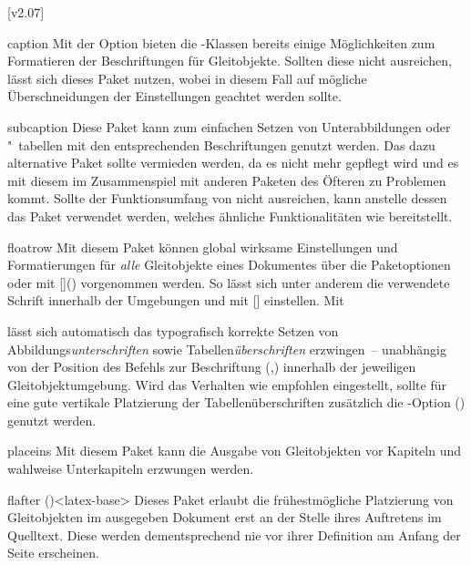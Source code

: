 [v2.07]
%
%
\begin{packages}
\item[caption]
  Mit der Option  bieten die 
  \KOMAScript-Klassen bereits einige Möglichkeiten zum Formatieren der 
  Beschriftungen für Gleitobjekte. Sollten diese nicht ausreichen, lässt sich 
  dieses Paket nutzen, wobei in diesem Fall auf mögliche Überschneidungen der 
  Einstellungen geachtet werden sollte.
\item[subcaption]
  Diese Paket kann zum einfachen Setzen von Unterabbildungen oder "~tabellen 
  mit den entsprechenden Beschriftungen genutzt werden. Das dazu alternative 
  Paket  sollte vermieden werden, da es nicht mehr gepflegt 
  wird und es mit diesem im Zusammenspiel mit anderen Paketen des Öfteren zu 
  Problemen kommt. Sollte der Funktionsumfang von  nicht 
  ausreichen, kann anstelle dessen das Paket  verwendet 
  werden, welches ähnliche Funktionalitäten wie  bereitstellt.
\item[floatrow]
  Mit diesem Paket können global wirksame Einstellungen und Formatierungen für 
  \emph{alle} Gleitobjekte eines Dokumentes über die Paketoptionen oder mit 
  [\MPValue{\dots}]() vorgenommen werden. 
  So lässt sich unter anderem die verwendete Schrift innerhalb der Umgebungen 
   und  mit 
  [] einstellen. Mit 
  \begin{Code}
  \end{Code}\vspace{-\baselineskip}%
  lässt sich automatisch das typografisch korrekte Setzen von 
  Abbildungs\emph{unterschriften} sowie Tabellen\emph{überschriften} 
  erzwingen~-- unabhängig von der Position des Befehls zur Beschriftung 
  (,) innerhalb der 
  jeweiligen Gleitobjektumgebung. Wird das Verhalten wie empfohlen eingestellt, 
  sollte für eine gute vertikale Platzierung der Tabellenüberschriften 
  zusätzlich die \KOMAScript-Option 
  () genutzt werden.
\item[placeins]
  Mit diesem Paket kann die Ausgabe von Gleitobjekten vor Kapiteln und wahlweise
  Unterkapiteln erzwungen werden.
\item[flafter]()<latex-base>
  Dieses Paket erlaubt die frühestmögliche Platzierung von Gleitobjekten im 
  ausgegeben Dokument erst an der Stelle ihres Auftretens im Quelltext. Diese 
  werden dementsprechend nie vor ihrer Definition am Anfang der Seite 
  erscheinen.
\end{packages}
